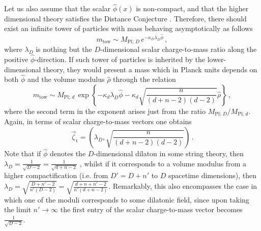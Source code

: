 Let us also assume that the scalar $\hat \phi (x)$ is non-compact, and that the higher dimensional theory satisfies the Distance Conjecture \cite{Ooguri:2006in}. Therefore, there should exist an infinite tower of particles with mass behaving asymptotically as follows
%
\begin{equation}\label{eq:SDCDdim}
	m_{\text{tow}} \sim  M_{\text{Pl};\, D}\, e^{-\kappa_D \lambda_D \hat \phi}\, ,
\end{equation}
%
where $\lambda_D$ is nothing but the $D$-dimensional scalar charge-to-mass ratio along the positive $\hat \phi$-direction. If such tower of particles is inherited by the lower-dimensional theory, they would present a mass which in Planck units depends on both $\hat \phi$ and the volume modulus $\hat \rho$ through the relation
%
\begin{equation}\label{eq:SDCddim}
	m_{\text{tow}} \sim  M_{\text{Pl};\, d}\, \exp\left\{-\kappa_d \lambda_D \hat \phi - \kappa_d \sqrt{\frac{n}{(d+n-2)(d-2)}} \hat \rho\right\}\, ,
\end{equation}
%
where the second term in the exponent arises just from the ratio $M_{\text{Pl};\, D}/M_{\text{Pl};\, d}$. Again, in terms of scalar charge-to-mass vectors one obtains
%
\begin{equation}\label{eq:chargetomasstower}
	\vec{\zeta}_{\text{t}} = \left( \lambda_D , \sqrt{\frac{n}{(d+n-2)(d-2)}} \right)\, .
\end{equation}
%
Note that if $\hat{\phi}$ denotes the $D$-dimensional dilaton in some string theory, then $\lambda_D=\frac{1}{\sqrt{D-2}}=\frac{1}{\sqrt{d+n-2}}$ \cite{Etheredge:2022opl, vandeHeisteeg:2023ubh}, whilst if it corresponds to a volume modulus from a higher compactification (i.e. from $D'=D+n'$ to $D$ spacetime dimensions), then $\lambda_D=\sqrt{\frac{D+n'-2}{n'(D-2)}}=\sqrt{\frac{d+n+n'-2}{n'(d+n-2)}}$. Remarkably, this also encompasses the case in which one of the moduli corresponds to some dilatonic field, since upon taking the limit $n'\to \infty$ the first entry of the scalar charge-to-mass vector becomes $\frac{1}{\sqrt{D-2}}$.
	

